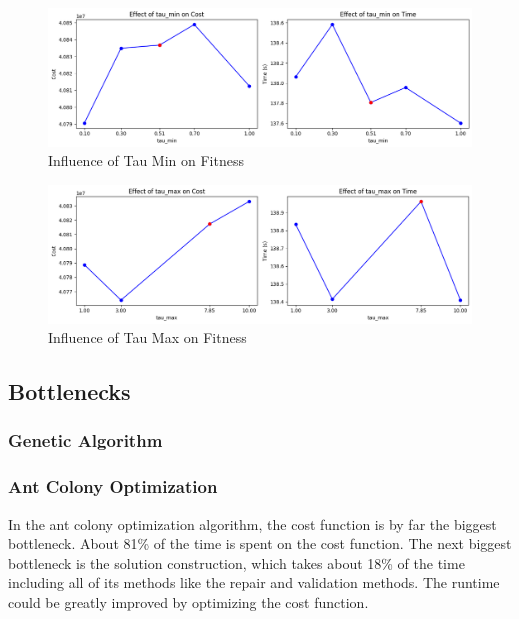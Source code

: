 \documentclass{article}
\begin{document}
\begin{figure}[H]
    \centering
    \includegraphics[width=\linewidth]{effect_of_tau_min.png}
    \caption{Influence of Tau Min on Fitness}
    \label{fig:tau_min}
\end{figure}

\begin{figure}[H]
    \centering
    \includegraphics[width=\linewidth]{effect_of_tau_max.png}
    \caption{Influence of Tau Max on Fitness}
    \label{fig:tau_max}
\end{figure}

\subsection{Bottlenecks}

\subsubsection{Genetic Algorithm}

\subsubsection{Ant Colony Optimization}
In the ant colony optimization algorithm, the cost function is by far the biggest bottleneck. About 81\% of the time is spent on the cost function.
The next biggest bottleneck is the solution construction, which takes about 18\% of the time including all of its methods like the repair and validation methods.
The runtime could be greatly improved by optimizing the cost function.
\end{document}
